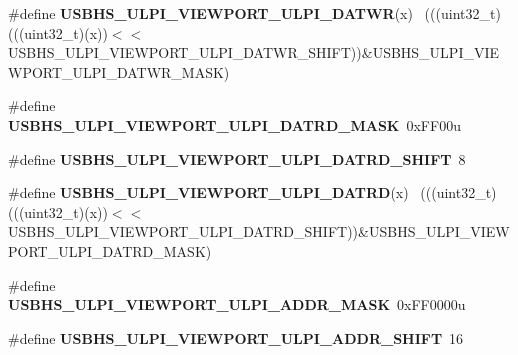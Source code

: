 \begin{DoxyCompactItemize}
\item 
\hypertarget{group___u_s_b_h_s___register___masks_ga5ec487b7ff368ff3be5d982d1c4d5dd6}{}\#define {\bfseries U\+S\+B\+H\+S\+\_\+\+U\+L\+P\+I\+\_\+\+V\+I\+E\+W\+P\+O\+R\+T\+\_\+\+U\+L\+P\+I\+\_\+\+D\+A\+T\+W\+R}(x)            ~(((uint32\+\_\+t)(((uint32\+\_\+t)(x))$<$$<$U\+S\+B\+H\+S\+\_\+\+U\+L\+P\+I\+\_\+\+V\+I\+E\+W\+P\+O\+R\+T\+\_\+\+U\+L\+P\+I\+\_\+\+D\+A\+T\+W\+R\+\_\+\+S\+H\+I\+F\+T))\&U\+S\+B\+H\+S\+\_\+\+U\+L\+P\+I\+\_\+\+V\+I\+E\+W\+P\+O\+R\+T\+\_\+\+U\+L\+P\+I\+\_\+\+D\+A\+T\+W\+R\+\_\+\+M\+A\+S\+K)\label{group___u_s_b_h_s___register___masks_ga5ec487b7ff368ff3be5d982d1c4d5dd6}

\item 
\hypertarget{group___u_s_b_h_s___register___masks_ga5e695bdcaedaac552e32a70c9d4e1d07}{}\#define {\bfseries U\+S\+B\+H\+S\+\_\+\+U\+L\+P\+I\+\_\+\+V\+I\+E\+W\+P\+O\+R\+T\+\_\+\+U\+L\+P\+I\+\_\+\+D\+A\+T\+R\+D\+\_\+\+M\+A\+S\+K}~0x\+F\+F00u\label{group___u_s_b_h_s___register___masks_ga5e695bdcaedaac552e32a70c9d4e1d07}

\item 
\hypertarget{group___u_s_b_h_s___register___masks_ga6753eb1cc80f3cda0881d5539f61471c}{}\#define {\bfseries U\+S\+B\+H\+S\+\_\+\+U\+L\+P\+I\+\_\+\+V\+I\+E\+W\+P\+O\+R\+T\+\_\+\+U\+L\+P\+I\+\_\+\+D\+A\+T\+R\+D\+\_\+\+S\+H\+I\+F\+T}~8\label{group___u_s_b_h_s___register___masks_ga6753eb1cc80f3cda0881d5539f61471c}

\item 
\hypertarget{group___u_s_b_h_s___register___masks_ga5926741c3503f6e0f236123067f1fb01}{}\#define {\bfseries U\+S\+B\+H\+S\+\_\+\+U\+L\+P\+I\+\_\+\+V\+I\+E\+W\+P\+O\+R\+T\+\_\+\+U\+L\+P\+I\+\_\+\+D\+A\+T\+R\+D}(x)            ~(((uint32\+\_\+t)(((uint32\+\_\+t)(x))$<$$<$U\+S\+B\+H\+S\+\_\+\+U\+L\+P\+I\+\_\+\+V\+I\+E\+W\+P\+O\+R\+T\+\_\+\+U\+L\+P\+I\+\_\+\+D\+A\+T\+R\+D\+\_\+\+S\+H\+I\+F\+T))\&U\+S\+B\+H\+S\+\_\+\+U\+L\+P\+I\+\_\+\+V\+I\+E\+W\+P\+O\+R\+T\+\_\+\+U\+L\+P\+I\+\_\+\+D\+A\+T\+R\+D\+\_\+\+M\+A\+S\+K)\label{group___u_s_b_h_s___register___masks_ga5926741c3503f6e0f236123067f1fb01}

\item 
\hypertarget{group___u_s_b_h_s___register___masks_gadb7d80009190fa2fe85f9c42c62b9890}{}\#define {\bfseries U\+S\+B\+H\+S\+\_\+\+U\+L\+P\+I\+\_\+\+V\+I\+E\+W\+P\+O\+R\+T\+\_\+\+U\+L\+P\+I\+\_\+\+A\+D\+D\+R\+\_\+\+M\+A\+S\+K}~0x\+F\+F0000u\label{group___u_s_b_h_s___register___masks_gadb7d80009190fa2fe85f9c42c62b9890}

\item 
\hypertarget{group___u_s_b_h_s___register___masks_gad15c2c7b55c4d9474c84998c0ae275f8}{}\#define {\bfseries U\+S\+B\+H\+S\+\_\+\+U\+L\+P\+I\+\_\+\+V\+I\+E\+W\+P\+O\+R\+T\+\_\+\+U\+L\+P\+I\+\_\+\+A\+D\+D\+R\+\_\+\+S\+H\+I\+F\+T}~16\label{group___u_s_b_h_s___register___masks_gad15c2c7b55c4d9474c84998c0ae275f8}


\end{DoxyCompactItemize}

